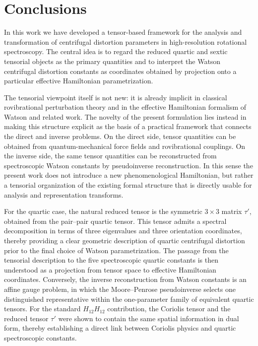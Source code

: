 \section{Conclusions}

In this work we have developed a tensor-based framework for the
analysis and transformation of centrifugal distortion parameters in
high-resolution rotational spectroscopy.  The central idea is to
regard the reduced quartic and sextic tensorial objects as the primary
quantities and to interpret the Watson centrifugal distortion constants
as coordinates obtained by projection onto a particular effective
Hamiltonian parametrization.

The tensorial viewpoint itself is not new: it is already implicit in
classical rovibrational perturbation theory and in the effective
Hamiltonian formalism of Watson and related work.  The novelty of the
present formulation lies instead in making this structure explicit as
the basis of a practical framework that connects the direct and inverse
problems.  On the direct side, tensor quantities can be obtained from
quantum-mechanical force fields and rovibrational couplings.  On the
inverse side, the same tensor quantities can be reconstructed from
spectroscopic Watson constants by pseudoinverse reconstruction.  In
this sense the present work does not introduce a new phenomenological
Hamiltonian, but rather a tensorial organization of the existing formal
structure that is directly usable for analysis and representation
transforms.

For the quartic case, the natural reduced tensor is the symmetric
$3\times 3$ matrix $\tau'$, obtained from the pair--pair quartic
tensor.  This tensor admits a spectral decomposition in terms of three
eigenvalues and three orientation coordinates, thereby providing a
clear geometric description of quartic centrifugal distortion prior to
the final choice of Watson parametrization.  The passage from the
tensorial description to the five spectroscopic quartic constants is
then understood as a projection from tensor space to effective
Hamiltonian coordinates.  Conversely, the inverse reconstruction from
Watson constants is an affine gauge problem, in which the
Moore--Penrose pseudoinverse selects one distinguished representative
within the one-parameter family of equivalent quartic tensors.  For the
standard $H_{12}H_{12}$ contribution, the Coriolis tensor and the
reduced tensor $\tau'$ were shown to contain the same spatial
information in dual form, thereby establishing a direct link between
Coriolis physics and quartic spectroscopic constants.

